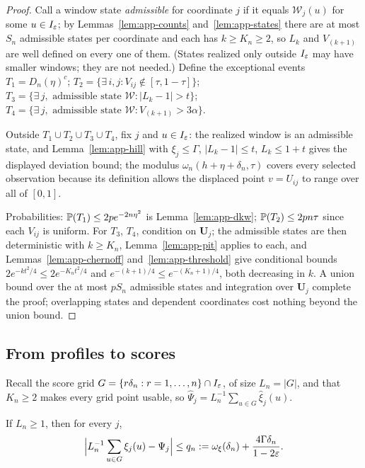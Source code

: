 \begin{proof}
Call a window state \emph{admissible} for coordinate $j$ if it equals
$\mathcal W_j(u)$ for some $u\in I_\varepsilon$; by
Lemmas~\ref{lem:app-counts} and~\ref{lem:app-states} there are at most
$S_n$ admissible states per coordinate and each has
$k\ge K_n\ge2$, so $L_k$ and $V_{(k+1)}$ are well defined on every one of
them.  (States realized only outside $I_\varepsilon$ may have smaller windows; they
are not needed.)  Define the exceptional events
$T_1=D_n(\eta)^c$;
$T_2=\{\exists\,i,j:V_{ij}\notin[\tau,1-\tau]\}$;
$T_3=\{\exists\,j,\text{ admissible state }\mathcal W:|L_k-1|>t\}$;
$T_4=\{\exists\,j,\text{ admissible state }\mathcal W:
V_{(k+1)}>3\alpha\}$.

Outside $T_1\cup T_2\cup T_3\cup T_4$, fix $j$ and $u\in I_\varepsilon$: the realized
window is an admissible state, and
Lemma~\ref{lem:app-hill} with $\xi_j\le\Gamma$, $|L_k-1|\le t$,
$L_k\le1+t$ gives the displayed deviation bound; the modulus
$\omega_n(h+\eta+\delta_n,\tau)$ covers every selected observation
because its definition allows the displaced point $v=U_{ij}$ to range
over all of $[0,1]$.

Probabilities: $\mathbb P(T_1)\le2pe^{-2n\eta^2}$ is
Lemma~\ref{lem:app-dkw}; $\mathbb P(T_2)\le2pn\tau$ since each $V_{ij}$ is
uniform.  For $T_3$, $T_4$, condition on $\bm U_j$; the admissible states
are then deterministic with $k\ge K_n$,
Lemma~\ref{lem:app-pit} applies to each, and
Lemmas~\ref{lem:app-chernoff} and~\ref{lem:app-threshold} give conditional
bounds $2e^{-kt^2/4}\le2e^{-K_nt^2/4}$ and
$e^{-(k+1)/4}\le e^{-(K_n+1)/4}$, both decreasing in $k$.  A union bound
over the at most $pS_n$ admissible states and
integration over $\bm U_j$ complete the proof; overlapping states and
dependent coordinates cost nothing beyond the union bound.
\end{proof}

\subsection{From profiles to scores}\label{app:scores}

Recall the score grid $G=\{r\delta_n:r=1,\ldots,n\}\cap I_\varepsilon$, of size
$L_n=|G|$, and that $K_n\ge2$ makes every grid point usable, so
$\widehat\Psi_j=L_n^{-1}\sum_{u\in G}\widehat\xi_j(u)$.

\begin{lemma}[Quadrature]\label{lem:app-quadrature}
If $L_n\ge1$, then for every $j$,
\begin{equation}
 \Bigl|L_n^{-1}\sum_{u\in G}\xi_j(u)-\Psi_j\Bigr|
 \le q_n:=\omega_\xi(\delta_n)+\frac{4\Gamma\delta_n}{1-2\varepsilon}.
 \label{eq:A5app}
\end{equation}
\end{lemma}

